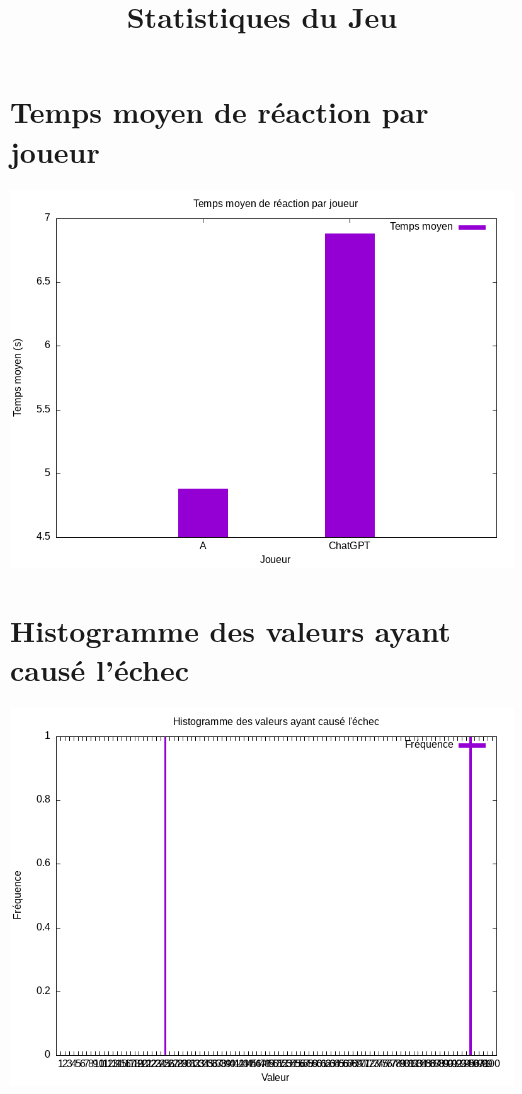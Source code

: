 \documentclass{article}
\title{Statistiques du Jeu}
\begin{document}
\maketitle

\section*{Temps moyen de réaction par joueur}
\includegraphics[width=\textwidth]{../Graphiques/temps_reaction_par_joueur.png}

\section*{Histogramme des valeurs ayant causé l'échec}
\includegraphics[width=\textwidth]{../Graphiques/valeurs_echec.png}
\end{document}

